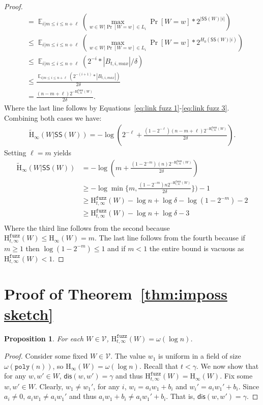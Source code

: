 \documentclass[11pt]{article}
\newcommand{\thref}[1]{\mbox{Theorem~\ref{#1}}}
\DeclareMathOperator*{\expe}{\mathbb{E}}
\newcommand{\class}[1]{{\ensuremath{\mathsf{#1}}}}
\newcommand{\sketch}{\ensuremath{\class{SS}}\xspace}
\newcommand{\dis}{\ensuremath{\mathsf{dis}}}
\newcommand{\poly}{\ensuremath{\mathtt{poly}}\xspace}
\newcommand{\Hoo}{\mathrm{H}_\infty}
\newcommand{\Hav}{\tilde{\mathrm{H}}_\infty}
\newcommand{\Hfuzz}{\mathrm{H}^{\mathtt{fuzz}}_{t,\infty}}
\newtheorem{proposition}[theorem]{Proposition}
\begin{document}
\begin{proof}
\begin{align*}
&= \expe_{i | m\le i \le n+\ell} \left(\max_{w\in W | \Pr[W=w]\in L_i} \Pr[W=w]*2^{|\sketch(W)|i|}\right)\\
&\le \expe_{i | m\le i \le n+\ell} \left(\max_{w\in W | \Pr[W=w]\in L_i} \Pr[W=w]*2^{H_0(\sketch(W) | i)}\right)\\
&\le \expe_{i | m\le i \le n+\ell} \left(2^{-i}*|B_{t, i, max}|/\delta\right)\\
&\le\frac{ \expe_{i | m\le i \le n+\ell} \left(2^{-(i+1)}*|B_{t, i, max}|\right)}{2\delta}\\
&= \frac{(n-m+\ell) 2^{-\Hfuzz(W)}}{2\delta}.
\end{align*}
Where the last line follows by Equations~\eqref{eq:link fuzz 1}-\eqref{eq:link fuzz 3}.
Combining both cases we have:
\begin{align*}
\Hav(W | \sketch(W)) = -\log \left(2^{-\ell}+\frac{(1-2^{-\ell})(n-m+\ell)2^{-\Hfuzz(W)}}{2\delta}\right).
\end{align*}
Setting $\ell = m$ yields
\begin{align*}
\Hav(W | \sketch(W)) &= -\log \left(m+\frac{(1-2^{-m})(n)2^{-\Hfuzz(W)}}{2\delta}\right)\\
&\ge -\log \min\{m, \frac{(1-2^{-m}) n2^{-\Hfuzz(W)}}{2\delta}\})-1\\
&\ge \Hfuzz(W) - \log n + \log \delta - \log (1-2^{-m}) - 2\\
&\ge \Hfuzz(W) - \log n + \log \delta - 3\\
\end{align*}
Where the third line follows from the second because $\Hfuzz(W)\le \Hoo(W) = m$. The last line follows from the fourth because if $m\ge 1$ then $\log (1-2^{-m})\le 1$ and if $m< 1$ the entire bound is vacuous as $\Hfuzz(W)< 1$.
\end{proof}

\section{Proof of \thref{thm:imposs sketch}}
\label{sec:proof secure sketch imposs}
\begin{proposition} 
\label{prop:each element good} For each $W\in\mathcal{V}$, $\Hfuzz(W) = \omega(\log n)$.
\end{proposition}
\begin{proof}
Consider some fixed $W\in\mathcal{V}$.  The value $w_1$ is uniform in a field of size $\omega(\poly(n))$, so $\Hoo(W) =\omega(\log n)$.  Recall that $t< \gamma$.  We now show that for any $w, w'\in W$, $\dis(w, w') = \gamma$ and thus $\Hfuzz(W) = \Hoo(W)$.  Fix some $w, w'\in W$.  Clearly, $w_1 \neq w_1'$, for any $i$, $w_i = a_i w_1 + b_i$ and $w_i' = a_i w_1' + b_i$.  Since $a_i\neq 0$, $a_iw_1 \neq a_iw_1'$ and thus $a_iw_1+b_i \neq a_iw_1'+b_i$.  That is, $\dis (w, w')  =\gamma$.
\end{proof}
\end{document}
